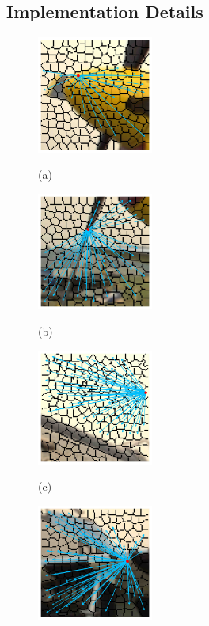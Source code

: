 \subsection{Implementation Details}
\begin{figure}[]
	\centering
	\begin{minipage}[t]{.24\linewidth}
		\includegraphics[width=1.5in]{cropped/jet_superpixel_4.jpg}
		\centerline{(a)}
	\end{minipage}
	\begin{minipage}[t]{.24\linewidth}
		\includegraphics[width=1.5in]{cropped/jet_superpixel_8.jpg}
		\centerline{(b)}
	\end{minipage}
	\begin{minipage}[t]{.24\linewidth}
		\includegraphics[width=1.5in]{cropped/jet_superpixel_6.jpg}
		\centerline{(c)}
	\end{minipage}
	\begin{minipage}[t]{.24\linewidth}
		\includegraphics[width=1.5in]{cropped/jet_superpixel_11.jpg}

\end{minipage}
\end{figure}
